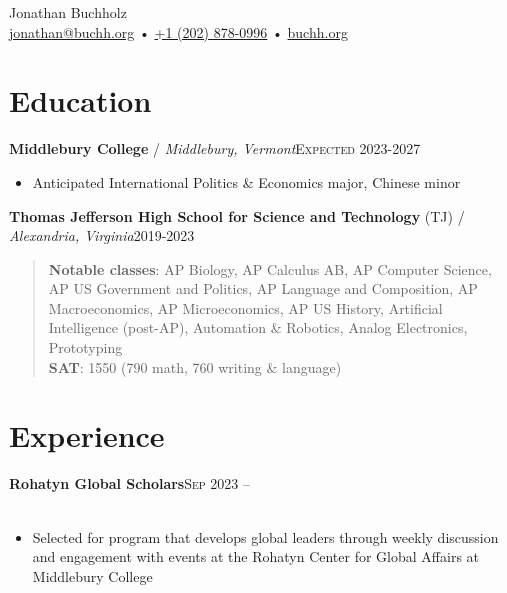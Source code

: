 \documentclass[12pt, a4paper]{article}
\begin{document}
{\LARGE Jonathan Buchholz}\\
\href{mailto:jonathan@buchh.org}{jonathan@buchh.org} • \href{tel:2028780996}{+1 (202) 878-0996} • \href{https://buchh.org}{buchh.org}\\

\vspace{-8mm}
\section*{Education}
\textbf{Middlebury College} / \textit{Middlebury, Vermont}\hfill\textsc{Expected 2023-2027}\\
\begin{itemize}
    \vspace{-8mm}
    \item Anticipated International Politics \& Economics major, Chinese minor
\end{itemize}
\textbf{Thomas Jefferson High School for Science and Technology} (TJ) / \textit{Alexandria, Virginia}\hfill\textsc{2019-2023}\\
\vspace{-4mm}
\begin{quote}
\vspace{-2mm}
\textbf{Notable classes}: AP Biology, AP Calculus AB, AP Computer Science, AP US Government and Politics, AP Language and Composition, AP Macroeconomics, AP Microeconomics, AP US History, Artificial Intelligence (post-AP), Automation \& Robotics, Analog Electronics, Prototyping\\
\vspace{-4mm}
\textbf{SAT}: 1550 (790 math, 760 writing \& language)\\
\end{quote}

\vspace{-8mm}
\section*{Experience}

\textbf{Rohatyn Global Scholars}\hfill\textsc{Sep 2023 --}\\\
\begin{itemize}
    \vspace{-8mm}
    \item Selected for program that develops global leaders through weekly discussion and engagement with events at the Rohatyn Center for Global Affairs at Middlebury College
\end{itemize}
\end{document}
